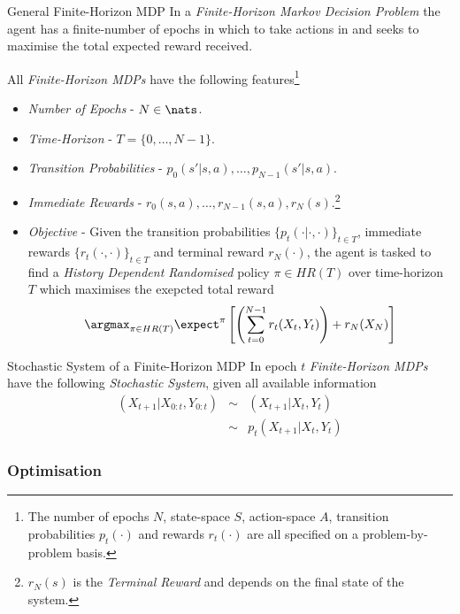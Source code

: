 \documentclass[11pt,a4paper]{article}
\begin{document}
  \begin{definition}{General Finite-Horizon MDP}
    In a \textit{Finite-Horizon Markov Decision Problem} the agent has a finite-number of epochs in which to take actions in and seeks to maximise the total expected reward received.
    \par All \textit{Finite-Horizon MDPs} have the following features\footnote{The number of epochs $N$, state-space $S$, action-space $A$, transition probabilities $p_t(\cdot)$ and rewards $r_t(\cdot)$ are all specified on a problem-by-problem basis.}
    \begin{itemize}
      \item \textit{Number of Epochs} - $N\in\nats$.
      \item \textit{Time-Horizon} - $T=\{0,\dots,N-1\}$.
      \item \textit{Transition Probabilities} - $p_0(s'|s,a),\dots,p_{N-1}(s'|s,a)$.
      \item \textit{Immediate Rewards} - $r_0(s,a),\dots,r_{N-1}(s,a),r_N(s)$.\footnote{$r_N(s)$ is the \textit{Terminal Reward} and depends on the final state of the system.}
      \item \textit{Objective} - Given the transition probabilities $\{p_t(\cdot|\cdot,\cdot)\}_{t\in T}$, immediate rewards $\{r_t(\cdot,\cdot)\}_{t\in T}$ and terminal reward $r_N(\cdot)$, the agent is tasked to find a \textit{History Dependent Randomised} policy $\pi\in HR(T)$ over time-horizon $T$ which maximises the exepcted total reward
      \[ \argmax_{\pi\in HR(T)}\expect^\pi\left[\left(\sum_{t=0}^{N-1}r_t(X_t,Y_t)\right)+r_N(X_N)\right] \]
    \end{itemize}
  \end{definition}

  \begin{proposition}{Stochastic System of a Finite-Horizon MDP}
    In epoch $t$ \textit{Finite-Horizon MDPs} have the following \textit{Stochastic System}, given all available information
    \[\begin{array}{rcl}
      (X_{t+1}|X_{0:t},Y_{0:t})&\sim&(X_{t+1}|X_t,Y_t)\\
      &\sim&p_t(X_{t+1}|X_t,Y_t)
    \end{array}\]
  \end{proposition}

\subsubsection{Optimisation}
\end{document}
